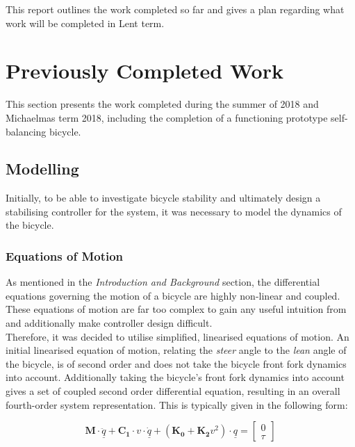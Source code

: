 \documentclass[12pt]{article}
\begin{document}
\noindent This report outlines the work completed so far and gives a plan regarding what work will be completed in Lent term.

\section{Previously Completed Work}
This section presents the work completed during the summer of 2018 and Michaelmas term 2018, including the completion of a functioning prototype self-balancing bicycle.

\subsection{Modelling}
Initially, to be able to investigate bicycle stability and ultimately design a stabilising controller for the system, it was necessary to model the dynamics of the bicycle.

\subsubsection{Equations of Motion}
As mentioned in the \textit{Introduction and Background} section, the differential equations governing the motion of a bicycle are highly non-linear and coupled. These equations of motion are far too complex to gain any useful intuition from and additionally make controller design difficult. \\

\noindent Therefore, it was decided to utilise simplified, linearised equations of motion. An initial linearised equation of motion, relating the \textit{steer} angle to the \textit{lean} angle of the bicycle, is of second order and does not take the bicycle front fork dynamics into account. Additionally taking the bicycle's front fork dynamics into account gives a set of coupled second order differential equation, resulting in an overall fourth-order system representation. This is typically given in the following form:

\begin{equation}
\mathbf{M} \cdot \underline{\ddot{q}} + \mathbf{C_1} \cdot v \cdot \underline{\dot{q}} + (\mathbf{K_0} + \mathbf{K_2} v^2) \cdot \underline{q} = \begin{bmatrix}
0 \\
\tau
\end{bmatrix}
\end{equation}

\vspace{0.2cm}
\end{document}
